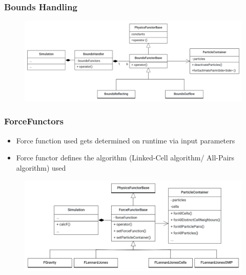 \begin{frame}
	\frametitle{Bounds Handling}
	\large
	\begin{figure}
		\centering
		\includegraphics[width=0.9\linewidth]{BoundaryMolSim}
		\label{fig:boundarymolsim}
	\end{figure}
\end{frame}



\begin{frame}
	\frametitle{ForceFunctors}
	\large
	\begin{itemize}
		\item Force function used gets determined on runtime via input parameters
		\item Force functor defines the algorithm (Linked-Cell algorithm/ All-Pairs algorithm) used
	\end{itemize}
	\vspace{-0.4cm}
	
	\begin{figure}
		\centering
		\includegraphics[width=0.8\linewidth]{ForceFunctorMolSim}
		\label{fig:forcefunctormolsim}
	\end{figure}
	
\end{frame}

